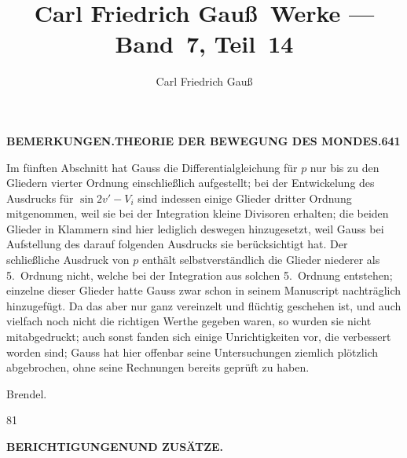 \documentclass[10pt,a4paper]{article}
\title{Carl Friedrich Gau\ss\ Werke --- Band~7, Teil~14}
\author{Carl Friedrich Gau\ss}
\date{}
\begin{document}
\maketitle
\thispagestyle{empty}

\newpage

\begin{center}
\textbf{BEMERKUNGEN.}\hfill\textbf{THEORIE DER BEWEGUNG DES MONDES.}\hfill\textbf{641}
\end{center}

\vspace{1em}

Im fünften Abschnitt hat Gauss die Differentialgleichung für $p$ nur bis zu den Gliedern vierter Ordnung einschließlich aufgestellt; bei der Entwickelung des Ausdrucks für $\sin 2v' - V_i$ sind indessen einige Glieder dritter Ordnung mitgenommen, weil sie bei der Integration kleine Divisoren erhalten; die beiden Glieder in Klammern sind hier lediglich deswegen hinzugesetzt, weil Gauss bei Aufstellung des darauf folgenden Ausdrucks sie berücksichtigt hat. Der schließliche Ausdruck von $p$ enthält selbstverständlich die Glieder niederer als 5.~Ordnung nicht, welche bei der Integration aus solchen 5.~Ordnung entstehen; einzelne dieser Glieder hatte Gauss zwar schon in seinem Manuscript nachträglich hinzugefügt. Da das aber nur ganz vereinzelt und flüchtig geschehen ist, und auch vielfach noch nicht die richtigen Werthe gegeben waren, so wurden sie nicht mitabgedruckt; auch sonst fanden sich einige Unrichtigkeiten vor, die verbessert worden sind; Gauss hat hier offenbar seine Untersuchungen ziemlich plötzlich abgebrochen, ohne seine Rechnungen bereits geprüft zu haben.

\hfill Brendel.

\vspace{3em}

\begin{flushright}
81
\end{flushright}

\newpage

\begin{center}
\textbf{BERICHTIGUNGEN}\hfill\textbf{UND ZUSÄTZE.}
\end{center}

\vspace{1em}
\end{document}
